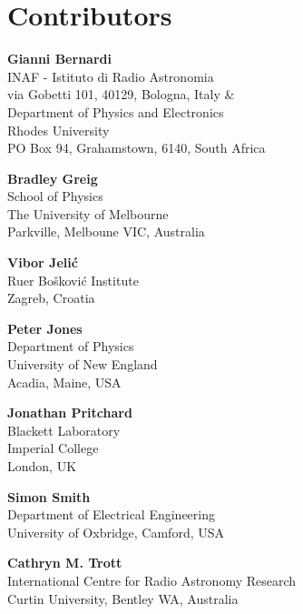 
\chapter*{Contributors}
 


{\parskip=12pt

\noindent\textbf{Gianni Bernardi}\\
INAF - Istituto di Radio Astronomia\\
via Gobetti 101, 40129, Bologna, Italy \& \\
Department of Physics and Electronics\\
Rhodes University\\
PO Box 94, Grahamstown, 6140, South Africa

\noindent\textbf{Bradley Greig}\\
School of Physics\\
The University of Melbourne\\
Parkville, Melboune VIC, Australia

\noindent\textbf{Vibor Jeli\'c}\\
Ru{\dj}er Bo\v{s}kovi\'{c} Institute\\ 
Zagreb, Croatia 

\noindent\textbf{Peter Jones}\\
Department of Physics\\
University of New England\\
Acadia, Maine, USA

\noindent\textbf{Jonathan Pritchard}\\
Blackett Laboratory\\
Imperial College\\
London, UK

\noindent\textbf{Simon Smith}\\
Department of Electrical Engineering\\
University of Oxbridge, 
Camford, USA

\noindent\textbf{Cathryn M. Trott}\\
International Centre for Radio Astronomy Research\\
Curtin University, Bentley WA, Australia

}
